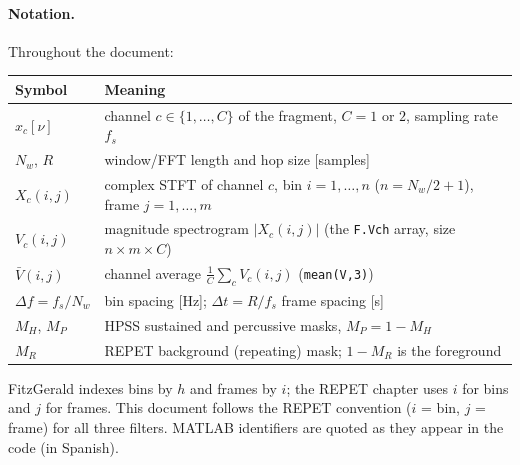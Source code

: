 \documentclass[11pt,a4paper]{article}
\newcommand{\code}[1]{\texttt{#1}}
\begin{document}
\paragraph{Notation.} Throughout the document:

\begin{center}
\begin{tabularx}{\linewidth}{@{}lL@{}}
\toprule
Symbol & Meaning \\
\midrule
$x_c[\nu]$ & channel $c\in\{1,\dots,C\}$ of the fragment, $C=1$ or $2$, sampling rate $f_s$ \\
$N_w$, $R$ & window/FFT length and hop size [samples] \\
$X_c(i,j)$ & complex STFT of channel $c$, bin $i=1,\dots,n$ ($n=N_w/2+1$), frame $j=1,\dots,m$ \\
$V_c(i,j)$ & magnitude spectrogram $|X_c(i,j)|$ (the \code{F.Vch} array, size $n\times m\times C$) \\
$\bar V(i,j)$ & channel average $\frac1C\sum_c V_c(i,j)$ (\code{mean(V,3)}) \\
$\Delta f=f_s/N_w$ & bin spacing [Hz]; $\Delta t=R/f_s$ frame spacing [s] \\
$M_H$, $M_P$ & HPSS sustained and percussive masks, $M_P=1-M_H$ \\
$M_R$ & REPET background (repeating) mask; $1-M_R$ is the foreground \\
\bottomrule
\end{tabularx}
\end{center}

FitzGerald indexes bins by $h$ and frames by $i$; the REPET chapter uses
$i$ for bins and $j$ for frames. This document follows the REPET convention
($i$ = bin, $j$ = frame) for all three filters. MATLAB identifiers are
quoted as they appear in the code (in Spanish).
\end{document}
